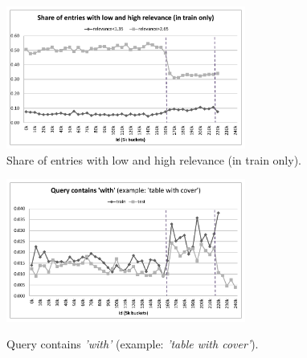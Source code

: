 \documentclass[12pt]{article}
\begin{document}
\begin{appendices}
\begin{figure}
  \centering
  \includegraphics[width=0.7\textwidth]{../Fig/plot_high_vs_low_relevance.pdf}\\
  \caption{Share of entries with low and high relevance (in train only).}
  \label{Fig:high_vs_low_relevance}
\includegraphics[width=0.7\textwidth]{../Fig/plot_query_with.pdf}\\
  \caption{Query contains \emph{'with'} (example: \emph{'table with cover'}).}
  \label{Fig:query_with}
\end{figure}


\end{appendices}
\end{document}
